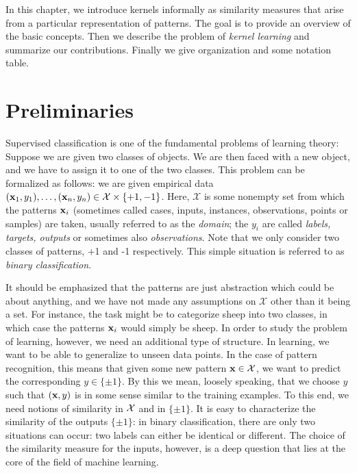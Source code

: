 In this chapter, we introduce kernels informally as similarity measures that arise from a particular representation of patterns. The goal is to provide an overview of the basic concepts. Then we describe the problem of {\em kernel learning} and summarize our contributions. Finally we give organization and some notation table.

\section{Preliminaries}

Supervised classification is one of the fundamental problems of learning theory: Suppose we are given two classes of objects. We are then faced with a new object, and we have to assign it to one of the two classes. This problem can be formalized as follows: we are given empirical data $(\mathbf{x}_1,y_1),\ldots,(\mathbf{x}_n,y_n)\in\mathcal X\times\{+1,-1\}$. Here, $\mathcal X$ is some nonempty set from which the patterns $\mathbf{x}_i$ (sometimes called cases, inputs, instances, observations, points or samples) are taken, usually referred to as the {\em domain}; the $y_i$ are called {\em labels, targets, outputs} or sometimes also {\em observations}. Note that we only consider two classes of patterns, +1 and -1 respectively. This simple situation is referred to as {\em binary classification}.

It should be emphasized that the patterns are just abstraction which could be about anything, and we have not made any assumptions on $\mathcal X$ other than it being a set. For instance, the task might be to categorize sheep into two classes, in which case the patterns $\mathbf{x}_i$ would simply be sheep.
In order to study the problem of learning, however, we need an additional type of structure. In learning, we want to be able to generalize to unseen data points. In the case of pattern recognition, this means that given some new pattern $\mathbf{x}\in{\cal X}$, we want to predict the corresponding $y\in\{\pm1\}$. By this we mean, loosely speaking, that we choose $y$ such that $(\mathbf{x}, y)$ is in some sense similar to the training examples. To this end, we need notions of similarity in ${\cal X}$ and in $\{\pm1\}$. It is easy to characterize the similarity of the outputs $\{\pm1\}$: in binary classification, there are only two situations can occur: two labels can either be identical or different. The choice of the similarity measure for the inputs, however, is a deep question that lies at the core of the field of machine learning.

